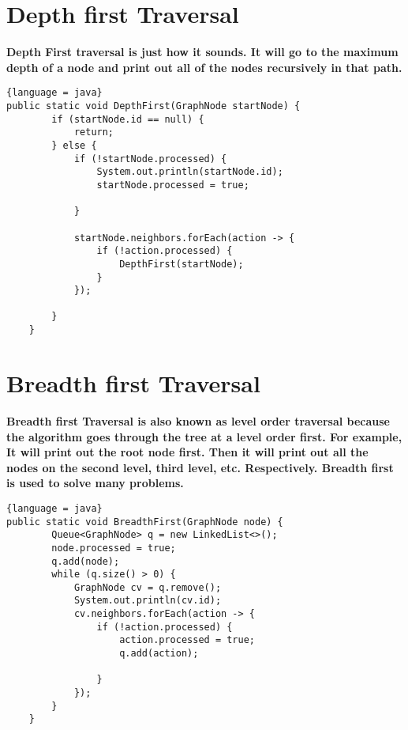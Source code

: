 \documentclass{article}
\begin{document}
\section{Depth first Traversal}
\textbf{Depth First traversal is just how it sounds. It will go to the maximum depth of a node and print out all of the nodes recursively in that path.}
\begin{lstlisting}{language = java}
public static void DepthFirst(GraphNode startNode) {
        if (startNode.id == null) {
            return;
        } else {
            if (!startNode.processed) {
                System.out.println(startNode.id);
                startNode.processed = true;

            }

            startNode.neighbors.forEach(action -> {
                if (!action.processed) {
                    DepthFirst(startNode);
                }
            });

        }
    }
\end{lstlisting}
\section{Breadth first Traversal}
\textbf{Breadth first Traversal is also known as level order traversal because the algorithm goes through the tree at a level order first. For example, It will print out the root node first. Then it will print out all the nodes on the second level, third level, etc. Respectively. Breadth first is used to solve many problems.}
\begin{lstlisting}{language = java}
public static void BreadthFirst(GraphNode node) {
        Queue<GraphNode> q = new LinkedList<>();
        node.processed = true;
        q.add(node);
        while (q.size() > 0) {
            GraphNode cv = q.remove();
            System.out.println(cv.id);
            cv.neighbors.forEach(action -> {
                if (!action.processed) {
                    action.processed = true;
                    q.add(action);

                }
            });
        }
    }
\end{lstlisting}
\end{document}
